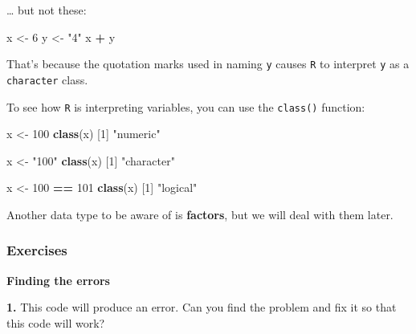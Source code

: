 \documentclass[]{book}
\newenvironment{Shaded}{\begin{snugshade}}{\end{snugshade}}
\newcommand{\DecValTok}[1]{\textcolor[rgb]{0.00,0.00,0.81}{#1}}
\newcommand{\KeywordTok}[1]{\textcolor[rgb]{0.13,0.29,0.53}{\textbf{#1}}}
\newcommand{\NormalTok}[1]{#1}
\newcommand{\OperatorTok}[1]{\textcolor[rgb]{0.81,0.36,0.00}{\textbf{#1}}}
\newcommand{\StringTok}[1]{\textcolor[rgb]{0.31,0.60,0.02}{#1}}
\begin{document}
\ldots{} but not these:

\begin{Shaded}
\begin{Highlighting}[]
\NormalTok{x <-}\StringTok{ }\DecValTok{6}
\NormalTok{y <-}\StringTok{ "4"}
\NormalTok{x }\OperatorTok{+}\StringTok{ }\NormalTok{y}
\end{Highlighting}
\end{Shaded}

That's because the quotation marks used in naming \texttt{y} causes \texttt{R} to interpret \texttt{y} as a \texttt{character} class.

To see how \texttt{R} is interpreting variables, you can use the \texttt{class()} function:

\begin{Shaded}
\begin{Highlighting}[]
\NormalTok{x <-}\StringTok{ }\DecValTok{100}
\KeywordTok{class}\NormalTok{(x)}
\NormalTok{[}\DecValTok{1}\NormalTok{] }\StringTok{"numeric"}
\end{Highlighting}
\end{Shaded}

\begin{Shaded}
\begin{Highlighting}[]
\NormalTok{x <-}\StringTok{ "100"}
\KeywordTok{class}\NormalTok{(x)}
\NormalTok{[}\DecValTok{1}\NormalTok{] }\StringTok{"character"}
\end{Highlighting}
\end{Shaded}

\begin{Shaded}
\begin{Highlighting}[]
\NormalTok{x <-}\StringTok{ }\DecValTok{100} \OperatorTok{==}\StringTok{ }\DecValTok{101}
\KeywordTok{class}\NormalTok{(x)}
\NormalTok{[}\DecValTok{1}\NormalTok{] }\StringTok{"logical"}
\end{Highlighting}
\end{Shaded}

Another data type to be aware of is \textbf{factors}, but we will deal with them later.

\hypertarget{exercises-2}{%
\subsubsection*{Exercises}\label{exercises-2}}

\textbf{Finding the errors}

\textbf{1.} This code will produce an error. Can you find the problem and fix it so that this code will work?
\end{document}
